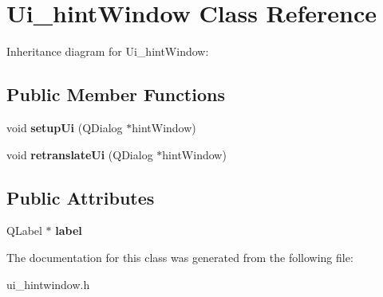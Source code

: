 \hypertarget{classUi__hintWindow}{}\section{Ui\+\_\+hint\+Window Class Reference}
\label{classUi__hintWindow}


Inheritance diagram for Ui\+\_\+hint\+Window\+:
\subsection*{Public Member Functions}
\begin{DoxyCompactItemize}
\item 
\mbox{\label{classUi__hintWindow_aa7010c112066876b3edfcd7269aace4b}} 
void {\bfseries setup\+Ui} (Q\+Dialog $\ast$hint\+Window)
\item 
\mbox{\label{classUi__hintWindow_aabc57e1ef87254f0a4f094d107c47659}} 
void {\bfseries retranslate\+Ui} (Q\+Dialog $\ast$hint\+Window)
\end{DoxyCompactItemize}
\subsection*{Public Attributes}
\begin{DoxyCompactItemize}
\item 
\mbox{\label{classUi__hintWindow_a8a17458ed907388a218083302798c4ff}} 
Q\+Label $\ast$ {\bfseries label}
\end{DoxyCompactItemize}


The documentation for this class was generated from the following file\+:\begin{DoxyCompactItemize}
\item 
ui\+\_\+hintwindow.\+h\end{DoxyCompactItemize}
